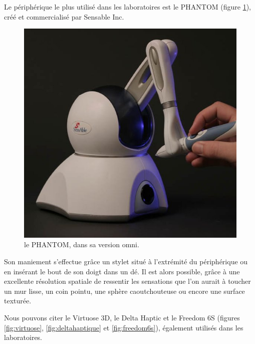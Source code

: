 \documentclass[
]{book}
\begin{document}
Le périphérique le plus utilisé dans les laboratoires est le PHANTOM
(figure \ref{fig:PHANTOM}), créé et commercialisé par
Sensable Inc.

\begin{figure}
\centering
\includegraphics{img/phantom-omni.png}
\caption{\label{fig:PHANTOM}le PHANTOM, dans sa version omni.}
\end{figure}

Son maniement s'effectue grâce un stylet situé à l'extrémité du
périphérique ou en insérant le bout de son doigt dans un dé. Il est alors
possible, grâce à une excellente résolution spatiale de ressentir les
sensations que l'on aurait à toucher un mur lisse, un coin pointu, une sphère
caoutchouteuse ou encore une surface texturée.

Nous pouvons citer le Virtuose 3D, le Delta Haptic et le Freedom 6S
(figures \ref{fig:virtuose}, \ref{fig:deltahaptique} et
\ref{fig:freedom6s}), également utilisés dans les laboratoires.
\end{document}
